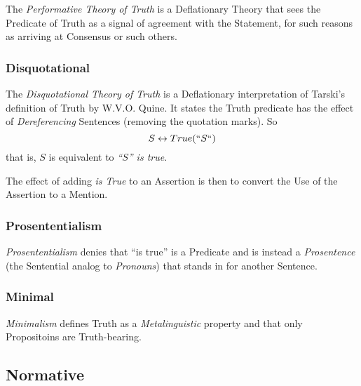 \documentclass{article}
\begin{document}
The \emph{Performative Theory of Truth} is a Deflationary Theory that
sees the Predicate of Truth as a signal of agreement with the
Statement, for such reasons as arriving at Consensus or such others.

\subsubsection{Disquotational}

The \emph{Disquotational Theory of Truth} is a Deflationary
interpretation of Tarski's definition of Truth by W.V.O. Quine. It
states the Truth predicate has the effect of \emph{Dereferencing}
Sentences (removing the quotation marks). So
\[
    S \leftrightarrow True(``S``)
\]
that is, $S$ is equivalent to \emph{``$S$'' is true}.

The effect of adding \emph{is True} to an Assertion is then to convert
the Use of the Assertion to a Mention.

\subsubsection{Prosententialism}

\emph{Prosententialism} denies that ``is true'' is a Predicate and is
instead a \emph{Prosentence} (the Sentential analog to
\emph{Pronouns}) that stands in for another Sentence.

\subsubsection{Minimal}

\emph{Minimalism} defines Truth as a \emph{Metalinguistic} property
and that only Propositoins are Truth-bearing.

\subsection{Normative}
\end{document}
